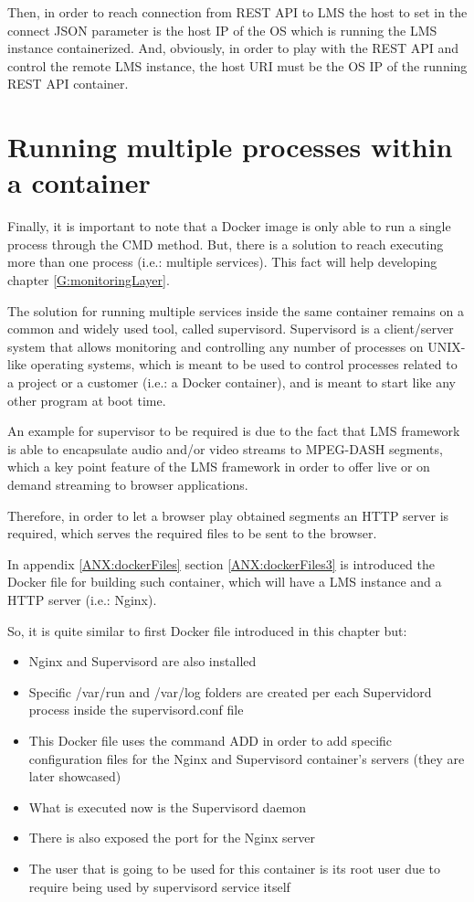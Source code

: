 Then, in order to reach connection from REST API to LMS the host to set in the connect JSON parameter is the host IP of the OS which is running the LMS instance containerized. And, obviously, in order to play with the REST API and control the remote LMS instance, the host URI must be the OS IP of the running REST API container.

\section{Running multiple processes within a container}

Finally, it is important to note that a Docker image is only able to run a single process through the CMD method. But, there is a solution to reach executing more than one process (i.e.: multiple services). This fact will help developing chapter \ref{G:monitoringLayer}.

The solution for running multiple services inside the same container remains on a common and widely used tool, called supervisord. Supervisord is a client/server system that allows monitoring and controlling any number of processes on UNIX-like operating systems, which is meant to be used to control processes related to a project or a customer (i.e.: a Docker container), and is meant to start like any other program at boot time.

An example for supervisor to be required is due to the fact that LMS framework is able to encapsulate audio and/or video streams to MPEG-DASH \cite{mpegdash} segments, which a key point feature of the LMS framework in order to offer live or on demand streaming to browser applications.

Therefore, in order to let a browser play obtained segments an HTTP server is required, which serves the required files to be sent to the browser.

In appendix \ref{ANX:dockerFiles} section \ref{ANX:dockerFiles3} is introduced the Docker file for building such container, which will have a LMS instance and a HTTP server (i.e.: Nginx).

So, it is quite similar to first Docker file introduced in this chapter but:

\begin{itemize}
\item Nginx and Supervisord are also installed
\item Specific /var/run and /var/log folders are created per each Supervidord process inside the supervisord.conf file
\item This Docker file uses the command ADD in order to add specific configuration files for the Nginx and Supervisord container's servers (they are later showcased)
\item What is executed now is the Supervisord daemon
\item There is also exposed the port for the Nginx server
\item The user that is going to be used for this container is its root user due to require being used by supervisord service itself
\end{itemize}

